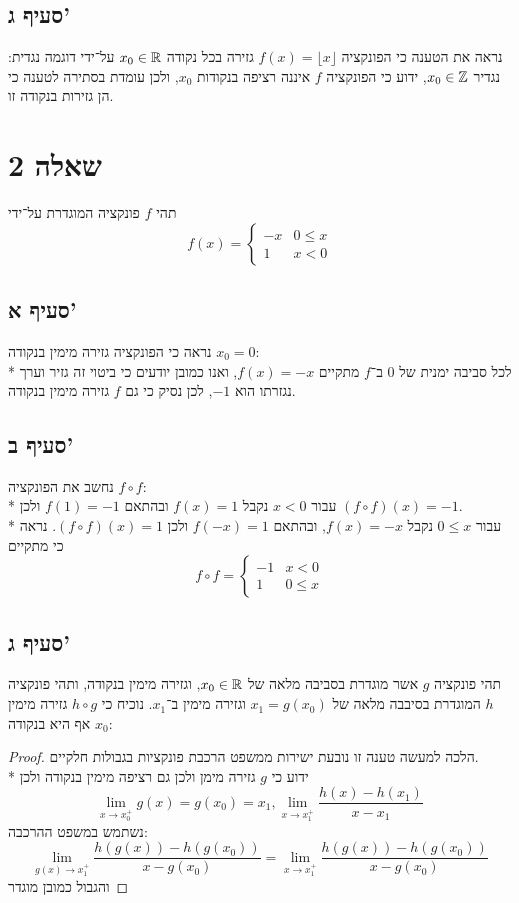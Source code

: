 \subsection{סעיף ג'}
נראה את הטענה כי הפונקציה $f(x) = \lfloor x \rfloor$ גזירה בכל נקודה $x_0 \in \mathbb{R}$ על־ידי דוגמה נגדית:
נגדיר $x_0 \in \mathbb{Z}$, ידוע כי הפונקציה $f$ איננה רציפה בנקודות $x_0$, ולכן עומדת בסתירה לטענה כי הן גזירות בנקודה זו.

\section{שאלה 2}
תהי $f$ פונקציה המוגדרת על־ידי
\[
	f(x) = \begin{cases}
		-x & 0 \le x \\
		1 & x < 0
	\end{cases}
\]

\subsection{סעיף א'}
נראה כי הפונקציה גזירה מימין בנקודה $x_0 = 0$: \\*
לכל סביבה ימנית של $0$ ב־$f$ מתקיים $f(x) = -x$, ואנו כמובן יודעים כי ביטוי זה גזיר וערך נגזרתו הוא $-1$, לכן נסיק כי גם $f$ גזירה מימין בנקודה.

\subsection{סעיף ב'}
נחשב את הפונקציה $f \circ f$: \\*
עבור $x < 0$ נקבל $f(x) = 1$ ובהתאם $f(1) = -1$ ולכן $(f \circ f)(x) = -1$. \\*
עבור $0 \le x$ נקבל $f(x) = -x$, ובהתאם $f(-x) = 1$ ולכן $(f \circ f)(x) = 1$. נראה כי מתקיים
\[
	f \circ f = \begin{cases}
		-1 & x < 0 \\
		1 & 0 \le x
	\end{cases}
\]

\subsection{סעיף ג'}
תהי פונקציה $g$ אשר מוגדרת בסביבה מלאה של $x_0 \in \mathbb{R}$, וגזירה מימין בנקודה, ותהי פונקציה $h$ המוגדרת בסיבבה מלאה של $x_1 = g(x_0)$ וגזירה מימין ב־$x_1$.
נוכיח כי $h \circ g$ גזירה מימין אף היא בנקודה $x_0$:
\begin{proof}
	הלכה למעשה טענה זו נובעת ישירות ממשפט הרכבת פונקציות בגבולות חלקיים. \\*
	ידוע כי $g$ גזירה מימן ולכן גם רציפה מימין בנקודה ולכן
	\[
		\lim_{x \to x_0^+} g(x) = g(x_0) = x_1,
		\lim_{x \to x_1^+} \frac{h(x) - h(x_1)}{x - x_1}
	\]
	נשתמש במשפט ההרכבה:
	\[
		\lim_{g(x) \to x_1^+} \frac{h(g(x)) - h(g(x_0))}{x - g(x_0)}
		= \lim_{x \to x_1^+} \frac{h(g(x)) - h(g(x_0))}{x - g(x_0)}
	\]
	והגבול כמובן מוגדר
\end{proof}

